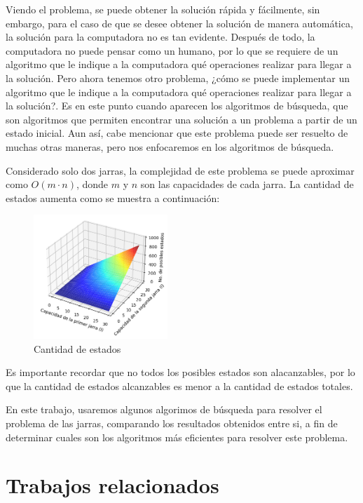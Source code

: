 \documentclass[journal]{IEEEtran}
\begin{document}
Viendo el problema, se puede obtener la solución rápida y fácilmente, sin embargo, para el caso de que se desee obtener la solución de manera automática, la solución para la computadora no es tan evidente.
Después de todo, la computadora no puede pensar como un humano, por lo que se requiere de un algoritmo que le indique a la computadora qué operaciones realizar para llegar a la solución.
Pero ahora tenemos otro problema, ¿cómo se puede implementar un algoritmo que le indique a la computadora qué operaciones realizar para llegar a la solución?. Es en este punto cuando aparecen los algoritmos de búsqueda, que son algoritmos que permiten encontrar una solución a un problema a partir de un estado inicial. Aun así, cabe mencionar que este problema puede ser resuelto de muchas otras maneras, pero nos enfocaremos en los algoritmos de búsqueda.

Considerado solo dos jarras, la complejidad de este problema se puede aproximar como $O(m \cdot n)$, donde $m$ y $n$ son las capacidades de cada jarra. La cantidad de estados aumenta como se muestra a continuación:

\begin{figure}[h]
  \centering
  \includegraphics[width=0.45\textwidth]{figures/estados.png}
  \centering
  \caption{Cantidad de estados}
  \label{fig:estados}  
\end{figure}

Es importante recordar que no todos los posibles estados son alacanzables, por lo que la cantidad de estados alcanzables es menor a la cantidad de estados totales.

En este trabajo, usaremos algunos algorimos de búsqueda para resolver el problema de las jarras, comparando los resultados obtenidos entre si, a fin de determinar cuales son los algoritmos más eficientes para resolver este problema.
\section{Trabajos relacionados}
\end{document}
